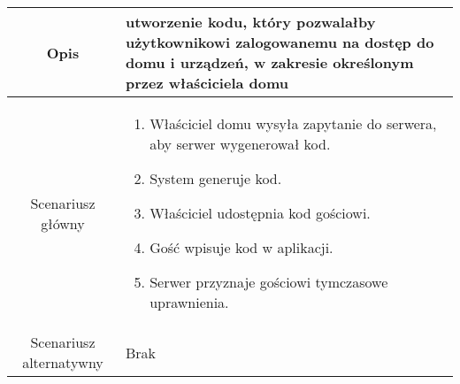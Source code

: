 \documentclass{article}
\begin{document}
\begin{enumerate}
\begin{enumerate}
\begin{table}[H]
\begin{tabular}{|c|p{7cm}|}
						\hline
						Opis                    & utworzenie kodu, który pozwalałby użytkownikowi zalogowanemu na dostęp do domu i urządzeń, w zakresie określonym przez właściciela domu                                                                                                                                             \\
						\hline
						Scenariusz główny       & \begin{enumerate}\item Właściciel domu wysyła zapytanie do serwera, aby serwer wygenerował kod.

\item System generuje kod.

\item Właściciel udostępnia kod gościowi.

\item Gość wpisuje kod w aplikacji.

\item Serwer przyznaje gościowi tymczasowe uprawnienia.\end{enumerate} \\
						\hline
						Scenariusz alternatywny & Brak                                                                                                                                                                                                                                                                                \\
						\hline
					\end{tabular}
				\end{table}


\end{enumerate}
\end{enumerate}
\end{document}
